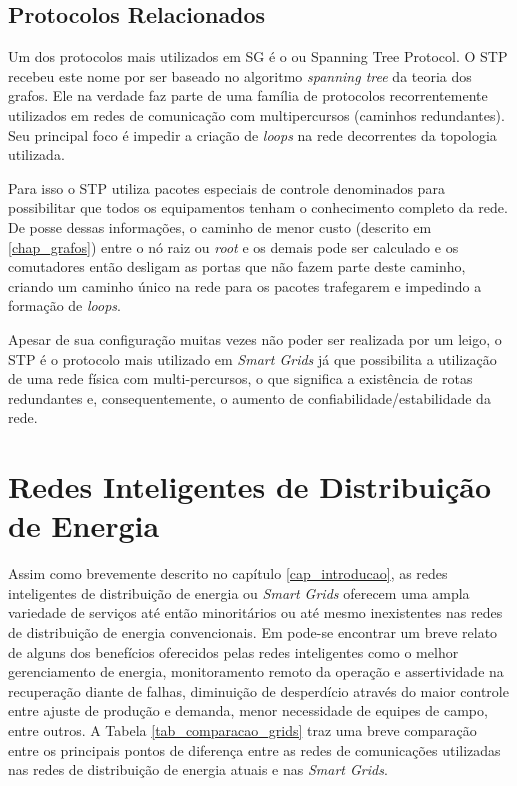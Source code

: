 \subsection{Protocolos Relacionados}
Um dos protocolos mais utilizados em SG é o  ou Spanning Tree Protocol. O STP recebeu este nome por ser baseado no algoritmo \emph{spanning tree} da teoria dos grafos. Ele na verdade faz parte de uma família de protocolos recorrentemente utilizados em redes de comunicação com multipercursos (caminhos redundantes). Seu principal foco é impedir a criação de \emph{loops} na rede decorrentes da topologia utilizada.

Para isso o STP utiliza pacotes especiais de controle denominados  para possibilitar que todos os equipamentos tenham o conhecimento completo da rede. De posse dessas informações, o caminho de menor custo (descrito em \ref{chap_grafos}) entre o nó raiz ou \emph{root} e os demais pode ser calculado e os comutadores então desligam as portas que não fazem parte deste caminho, criando um caminho único na rede para os pacotes trafegarem e impedindo a formação de \emph{loops}.

Apesar de sua configuração muitas vezes não poder ser realizada por um leigo, o STP é o protocolo mais utilizado em \emph{Smart Grids} já que possibilita a utilização de uma rede física com multi-percursos, o que significa a existência de rotas redundantes e, consequentemente, o aumento de confiabilidade/estabilidade da rede.

\section{Redes Inteligentes de Distribuição de Energia}
Assim como brevemente descrito no capítulo \ref{cap_introducao}, as redes inteligentes de distribuição de energia ou \emph{Smart Grids} oferecem uma ampla variedade de serviços até então minoritários ou até mesmo inexistentes nas redes de distribuição de energia convencionais. Em \cite{Art-Ma2013} pode-se encontrar um breve relato de alguns dos benefícios oferecidos pelas redes inteligentes como o melhor gerenciamento de energia, monitoramento remoto da operação e assertividade na recuperação diante de falhas, diminuição de desperdício através do maior controle entre ajuste de produção e demanda, menor necessidade de equipes de campo, entre outros. A Tabela \ref{tab_comparacao_grids} traz uma breve comparação entre os principais pontos de diferença entre as redes de comunicações utilizadas nas redes de distribuição de energia atuais e nas \emph{Smart Grids}.

